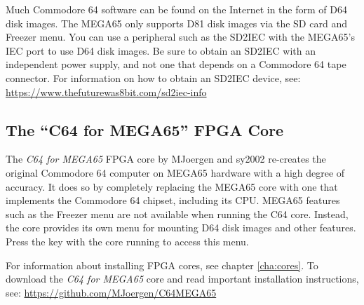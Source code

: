 Much Commodore 64 software can be found on the Internet in the form of D64 disk images. The MEGA65 only supports D81 disk images via the SD card and Freezer menu. You can use a peripheral such as the SD2IEC with the MEGA65's IEC port to use D64 disk images. Be sure to obtain an SD2IEC with an independent power supply, and not one that depends on a Commodore 64 tape connector. For information on how to obtain an SD2IEC device, see: \url{https://www.thefuturewas8bit.com/sd2iec-info}

\subsection{The ``C64 for MEGA65'' FPGA Core}

The {\it C64 for MEGA65} FPGA core by MJoergen and sy2002 re-creates the original Commodore 64 computer on MEGA65 hardware with a high degree of accuracy. It does so by completely replacing the MEGA65 core with one that implements the Commodore 64 chipset, including its CPU. MEGA65 features such as the Freezer menu are not available when running the C64 core. Instead, the core provides its own menu for mounting D64 disk images and other features. Press the  key with the core running to access this menu.


For information about installing FPGA cores, see chapter \vref{cha:cores}. To download the {\it C64 for MEGA65} core and read important installation instructions, see: \url{https://github.com/MJoergen/C64MEGA65}
